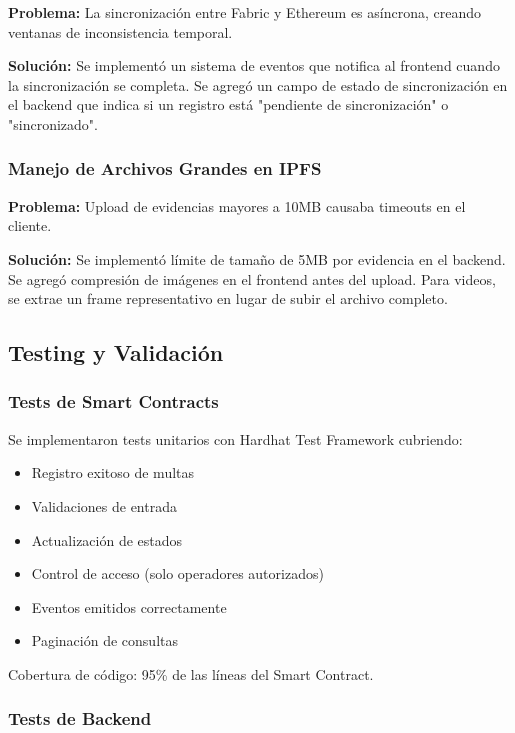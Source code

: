 \textbf{Problema:} La sincronización entre Fabric y Ethereum es asíncrona, creando ventanas de inconsistencia temporal.

\textbf{Solución:} Se implementó un sistema de eventos que notifica al frontend cuando la sincronización se completa. Se agregó un campo de estado de sincronización en el backend que indica si un registro está "pendiente de sincronización" o "sincronizado".

\subsubsection{Manejo de Archivos Grandes en IPFS}

\textbf{Problema:} Upload de evidencias mayores a 10MB causaba timeouts en el cliente.

\textbf{Solución:} Se implementó límite de tamaño de 5MB por evidencia en el backend. Se agregó compresión de imágenes en el frontend antes del upload. Para videos, se extrae un frame representativo en lugar de subir el archivo completo.

\subsection{Testing y Validación}

\subsubsection{Tests de Smart Contracts}

Se implementaron tests unitarios con Hardhat Test Framework cubriendo:
\begin{itemize}
    \item Registro exitoso de multas
    \item Validaciones de entrada
    \item Actualización de estados
    \item Control de acceso (solo operadores autorizados)
    \item Eventos emitidos correctamente
    \item Paginación de consultas
\end{itemize}

Cobertura de código: 95\% de las líneas del Smart Contract.

\subsubsection{Tests de Backend}

